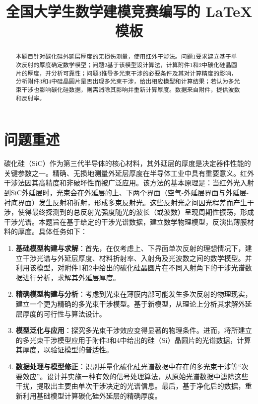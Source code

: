\documentclass[withoutpreface,bwprint]{cumcmthesis} %
\title{全国大学生数学建模竞赛编写的 \LaTeX{} 模板}
\begin{document}
\maketitle
\begin{abstract}
    本题目针对碳化硅外延层厚度的无损伤测量，使用红外干涉法。问题1要求建立基于单次反射的厚度确定数学模型；问题2基于该模型设计算法，计算附件1和2中碳化硅晶圆片的厚度，并分析可靠性；问题3推导多光束干涉的必要条件及其对计算精度的影响，分析附件3和4中硅晶圆片是否出现多光束干涉，给出相应模型和计算结果；若认为多光束干涉也影响碳化硅数据，则需消除其影响并重新计算厚度。数据来自附件，提供波数和反射率。
\end{abstract}


\section{问题重述}
碳化硅（SiC）作为第三代半导体的核心材料，其外延层的厚度是决定器件性能的关键参数之一。精确、无损地测量外延层厚度在半导体工业中具有重要意义。红外干涉法因其高精度和非破坏性而被广泛应用。该方法的基本原理是：当红外光入射到SiC外延层时，光束会在外延层的上、下两个界面（空气-外延层界面与外延层-衬底界面）发生反射和折射，形成多束反射光。这些反射光之间因光程差而产生干涉，使得最终探测到的总反射光强度随光的波长（或波数）呈现周期性振荡，形成干涉光谱。本题旨在基于给定的干涉光谱数据，建立数学物理模型，反演出薄膜材料的厚度。具体任务如下：
\begin{enumerate}
    \item \textbf{基础模型构建与求解}：首先，在仅考虑上、下界面单次反射的理想情况下，建立干涉光谱与外延层厚度、材料折射率、入射角及光波数之间的数学模型。并利用该模型，对附件1和2中给出的碳化硅晶圆片在不同入射角下的干涉光谱数据进行分析，求解其外延层厚度。
    \item \textbf{精确模型构建与分析}：考虑到光束在薄膜内部可能发生多次反射的物理现实，建立一个更为精确的多光束干涉模型。基于新模型，从理论上分析其求解外延层厚度的可行性与算法设计。
    \item \textbf{模型泛化与应用}：探究多光束干涉效应变得显著的物理条件。进而，将所建立的多光束干涉模型应用于附件3和4中给出的硅（Si）晶圆片的光谱数据，计算其厚度，以验证模型的普适性。
    \item \textbf{数据处理与模型修正}：识别并量化碳化硅光谱数据中存在的多光束干涉等“次要效应”。设计并实施一种有效的信号处理算法，从原始光谱数据中滤除这些干扰，提取出主要由单次干涉决定的光谱信息。最后，基于净化后的数据，重新利用基础模型计算碳化硅外延层的精确厚度。
\end{enumerate}
\end{document}
